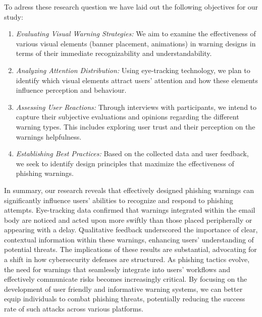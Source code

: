 \documentclass[
  a4paper,  %
  twoside,  %
  bibliography=totoc,
  headsepline,
  cleardoublepage=empty,
  parskip=half,
  draft=false
]{scrbook}
\begin{document}
To adress these research question we have laid out the following objectives for our study:

\begin{enumerate}
    \item \textit{Evaluating Visual Warning Strategies:} We aim to examine the effectiveness of various visual elements (banner placement, animations) in warning designs in terms of their immediate recognizability and understandability.
    \item \textit{Analyzing Attention Distribution:} Using eye-tracking technology, we plan to identify which visual elements attract users' attention and how these elements influence perception and behaviour.
    \item \textit{Assessing User Reactions:} Through interviews with participants, we intend to capture their subjective evaluations and opinions regarding the different warning types. This includes exploring user trust and their perception on the warnings helpfulness.
    \item \textit{Establishing Best Practices:} Based on the collected data and user feedback, we seek to identify design principles that maximize the effectiveness of phishing warnings.
\end{enumerate}

In summary, our research reveals that effectively designed phishing warnings can significantly influence users' abilities to recognize and respond to phishing attempts. Eye-tracking data confirmed that warnings integrated within the email body are noticed and acted upon more swiftly than those placed peripherally or appearing with a delay. Qualitative feedback underscored the importance of clear, contextual information within these warnings, enhancing users' understanding of potential threats. \newline
The implications of these results are substantial, advocating for a shift in how cybersecurity defenses are structured. As phishing tactics evolve, the need for warnings that seamlessly integrate into users' workflows and effectively communicate risks becomes increasingly critical. By focusing on the development of user friendly and informative warning systems, we can better equip individuals to combat phishing threats, potentially reducing the success rate of such attacks across various platforms. 
\end{document}
